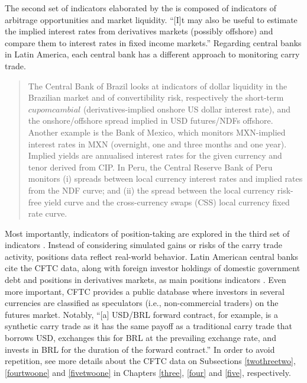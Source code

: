 \documentclass[a4paper, twoside]{templates/ociamthesis}
\begin{document}
The second set of indicators elaborated by the \textcite{bankforinternationalsettlements2015} is composed of indicators of arbitrage opportunities and market liquidity. ``{[}I{]}t may also be useful to estimate the implied interest rates from derivatives markets (possibly offshore) and compare them to interest rates in fixed income markets.'' \autocite[ 21]{bankforinternationalsettlements2015} Regarding central banks in Latin America, each central bank has a different approach to monitoring carry trade.

\begin{quote}
The Central Bank of Brazil looks at indicators of dollar liquidity in the Brazilian market and of convertibility risk, respectively the short-term \(cupom cambial\) (derivatives-implied onshore US dollar interest rate), and the onshore/offshore spread implied in USD futures/NDFs offshore. Another example is the Bank of Mexico, which monitors MXN-implied interest rates in MXN (overnight, one and three months and one year). Implied yields are annualised interest rates for the given currency and tenor derived from CIP. In Peru, the Central Reserve Bank of Peru monitors (i) spreads between local currency interest rates and implied rates from the NDF curve; and (ii) the spread between the local currency risk-free yield curve and the cross-currency swaps (CSS) local currency fixed rate curve. \autocite[ 21]{bankforinternationalsettlements2015}
\end{quote}

Most importantly, indicators of position-taking are explored in the third set of indicators \autocite{bankforinternationalsettlements2015}. Instead of considering simulated gains or risks of the carry trade activity, positions data reflect real-world behavior. Latin American central banks cite the CFTC data, along with foreign investor holdings of domestic government debt and positions in derivatives markets, as main positions indicators \autocite{bankforinternationalsettlements2015}. Even more important, CFTC provides a public database where investors in several currencies are classified as speculators (i.e., non-commercial traders) on the futures market. Notably, ``{[}a{]} USD/BRL forward contract, for example, is a synthetic carry trade as it has the same payoff as a traditional carry trade that borrows USD, exchanges this for BRL at the prevailing exchange rate, and invests in BRL for the duration of the forward contract.'' \autocite[ 31]{avdjiev2011} In order to avoid repetition, see more details about the CFTC data on Subsections \ref{twothreetwo}, \ref{fourtwoone} and \ref{fivetwoone} in Chapters \ref{three}, \ref{four} and \ref{five}, respectively.
\end{document}
